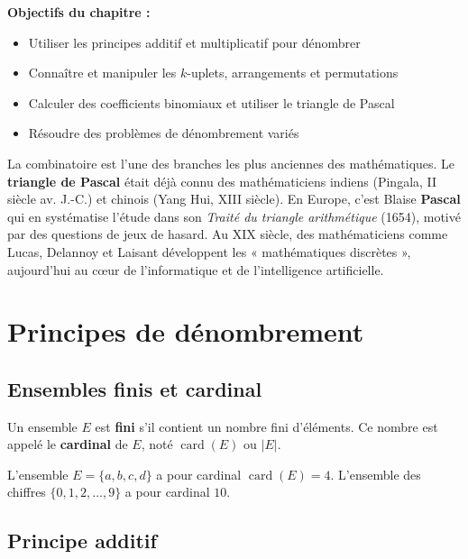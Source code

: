 \documentclass[12pt,a4paper,twoside]{book}
\DeclareMathOperator{\card}{card}
\begin{document}
\medskip

\textbf{Objectifs du chapitre :}
\begin{itemize}[leftmargin=*]
  \item Utiliser les principes additif et multiplicatif pour dénombrer
  \item Connaître et manipuler les $k$-uplets, arrangements et permutations
  \item Calculer des coefficients binomiaux et utiliser le triangle de Pascal
  \item Résoudre des problèmes de dénombrement variés
\end{itemize}

\begin{histoire}
La combinatoire est l'une des branches les plus anciennes des mathématiques. Le \textbf{triangle de Pascal} était déjà connu des mathématiciens indiens (Pingala, II\ieme{} siècle av. J.-C.) et chinois (Yang Hui, XIII\ieme{} siècle). En Europe, c'est Blaise \textbf{Pascal} qui en systématise l'étude dans son \textit{Traité du triangle arithmétique} (1654), motivé par des questions de jeux de hasard. Au XIX\ieme{} siècle, des mathématiciens comme Lucas, Delannoy et Laisant développent les « mathématiques discrètes », aujourd'hui au cœur de l'informatique et de l'intelligence artificielle.
\end{histoire}

\section{Principes de dénombrement}

\subsection{Ensembles finis et cardinal}

\begin{definition}
Un ensemble $E$ est \textbf{fini} s'il contient un nombre fini d'éléments. Ce nombre est appelé le \textbf{cardinal} de $E$, noté $\card(E)$ ou $|E|$.
\end{definition}

\begin{exemple}
L'ensemble $E = \{a, b, c, d\}$ a pour cardinal $\card(E) = 4$. L'ensemble des chiffres $\{0, 1, 2, \ldots, 9\}$ a pour cardinal $10$.
\end{exemple}

\subsection{Principe additif}
\end{document}

